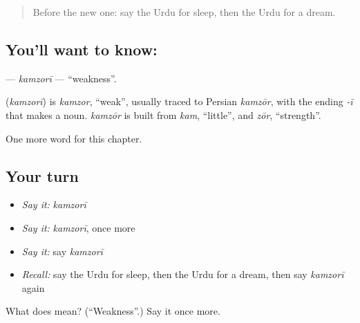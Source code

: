 \begin{quote}
Before the new one: say the Urdu for sleep, then the Urdu for a dream.
\end{quote}

\subsection*{You'll want to know: }
\textbf{} — \emph{kamzorī} — \textquotedblleft{}weakness\textquotedblright{}.

\begin{cousinweb}
\textbf{} (\emph{kamzorī}) is \emph{kamzor}, \textquotedblleft{}weak\textquotedblright{}, usually traced to Persian \emph{kamzōr}, with the ending \emph{-ī} that makes a noun. \emph{kamzōr} is built from \emph{kam}, \textquotedblleft{}little\textquotedblright{}, and \emph{zōr}, \textquotedblleft{}strength\textquotedblright{}.
\end{cousinweb}

\begin{grammarlens}[title={What you've built}]
One more word for this chapter.
\end{grammarlens}

\subsection*{Your turn}
\begin{itemize}
\raggedright
  \item \emph{Say it:} \emph{kamzorī}
  \item \emph{Say it:} \emph{kamzorī}, once more
  \item \emph{Say it:} say \emph{kamzorī}
  \item \emph{Recall:} say the Urdu for sleep, then the Urdu for a dream, then say \emph{kamzorī} again
\end{itemize}

\begin{tcolorbox}[breakable,colback=teal!4,colframe=teal!35!black,title={Before you move on}]
What does  mean? (\textquotedblleft{}Weakness\textquotedblright{}.) Say it once more.
\end{tcolorbox}

